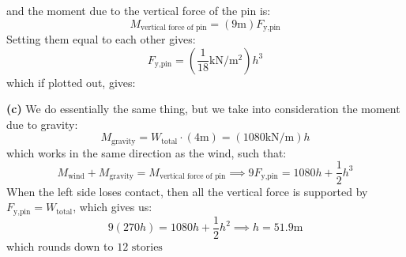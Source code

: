 \documentclass{article}
\begin{document}
and the moment due to the vertical force of the pin is:
\begin{equation}
    M_\text{vertical force of pin} = (9\si{\meter})F_\text{y,pin}
    \label{eq:}
\end{equation}
Setting them equal to each other gives:
\begin{equation}
    F_\text{y,pin} = \left(\frac{1}{18}\si{\kilo\newton\per\meter\squared}\right)h^3
    \label{eq:}
\end{equation}
which if plotted out, gives:
\begin{center}
\end{center}

\textbf{(c)} We do essentially the same thing, but we take into consideration the moment due to gravity:
\begin{equation}
    M_\text{gravity} = W_\text{total} \cdot (4\si{\meter}) = \left(1080\si{\kilo\newton\per\meter}\right)h
    \label{eq:}
\end{equation}
which works in the same direction as the wind, such that:
\begin{equation}
    M_\text{wind}+M_\text{gravity}=M_\text{vertical force of pin} \implies 9F_\text{y,pin} = 1080h + \frac{1}{2}h^3
    \label{eq:}
\end{equation}
When the left side loses contact, then all the vertical force is supported by $F_\text{y,pin}=W_\text{total}$, which gives us:
\begin{equation}
    9(270h)=1080h+\frac{1}{2}h^2 \implies h=51.9\si{\meter}
    \label{eq:}
\end{equation}
which rounds down to $\boxed{12 \text{ stories}}$
\end{document}
